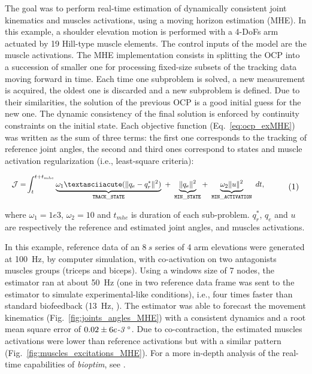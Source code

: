 The goal was to perform real-time estimation of dynamically consistent joint kinematics and muscles activations, using a moving horizon estimation (MHE). 
In this example, a shoulder elevation motion is performed with a 4-DoFs arm actuated by 19 Hill-type muscle elements.
The control inputs of the model are the muscle activations.
The MHE implementation consists in splitting the OCP into a succession of smaller one for processing fixed-size subsets of the tracking data moving forward in time. 
Each time one subproblem is solved, a new measurement is acquired, the oldest one is discarded and a new subproblem is defined. 
Due to their similarities, the solution of the previous OCP is a good initial guess for the new one. 
The dynamic consistency of the final solution is enforced by continuity constraints on the initial state. 
Each objective function (Eq.~\ref{eq:ocp_exMHE}) was written as the sum of three terms: the first one corresponds to the tracking of reference joint angles, the second and third ones correspond to states and muscle activation regularization (i.e., least-square criteria): 

\[ 
\resizebox{0.9\columnwidth}{!}{$ 
\begin{aligned}
\mathcal{J} = &\int_t^{t+t_{mhe}}\underbrace{\omega_1´(\|q_{e} - q^*_{r}\|^{2})}_{\mathtt{TRACK\_STATE}}~ 
+ ~ \underbrace{\|q_{e}\|^2}_{\mathtt{MIN\_STATE}}
+ ~ \underbrace{\omega_2 \|u\|^2}_{\mathtt{MIN\_ACTIVATION}}~dt, 
\end{aligned}  
$}  
\addtag  
\label{eq:ocp_exMHE}  
\]  

\noindent where $\omega_1 =1e3$, $\omega_2 = 10$ and $t_{mhe}$ is duration of each sub-problem. $q^*_{r}$, $q_{e}$ and $u$ are respectively the reference and estimated joint angles, and muscles activations. 

In this example, reference data of an $8~s$ series of 4 arm elevations were generated at 100~Hz, by computer simulation, with co-activation on two antagonists muscles groups (triceps and biceps).
Using a windows size of 7 nodes, the estimator ran at about 50~Hz (one in two reference data frame was sent to the estimator to simulate experimental-like conditions), i.e., four times faster than standard biofeedback (13~Hz, \cite{kannape2013biofeedback}).
The estimator was able to forecast the movement kinematics (Fig.~\ref{fig:joints_angles_MHE}) with a consistent dynamics and a root mean square error of $0.02\pm6e\emph{-3}\text{~}^{\circ}$.
Due to co-contraction, the estimated muscles activations were lower than reference activations but with a similar pattern (Fig.~\ref{fig:muscles_excitations_MHE}).  
For a more in-depth analysis of the real-time capabilities of \textit{bioptim}, see \cite{bailly2020real}.
 

